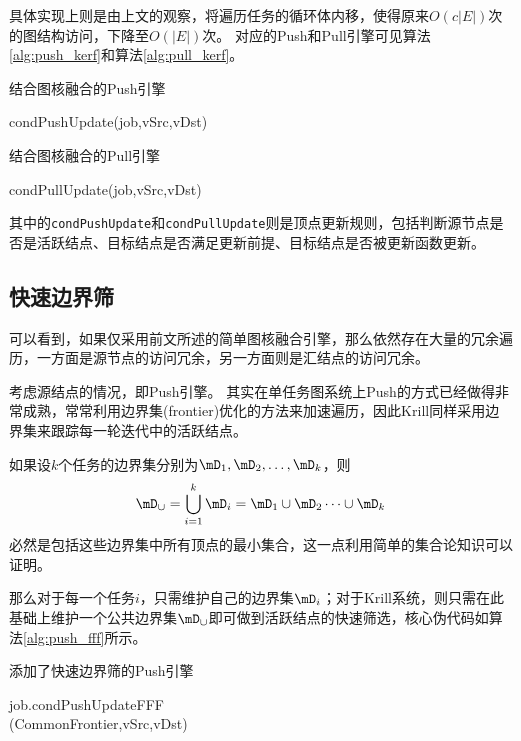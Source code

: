 \documentclass[logo,reportComp]{thesis}
\begin{document}
具体实现上则是由上文的观察，将遍历任务的循环体内移，使得原来$O(c|E|)$次的图结构访问，下降至$O(|E|)$次。
对应的Push和Pull引擎可见算法\ref{alg:push_kerf}和算法\ref{alg:pull_kerf}。
\begin{algorithm}[!ht]
\caption{结合图核融合的Push引擎}
\label{alg:push_kerf}
\begin{algorithmic}[1]
\State condPushUpdate(job,vSrc,vDst)
\EndFor
\EndFor
\EndFor
\end{algorithmic}
\end{algorithm}
\begin{algorithm}[!ht]
\caption{结合图核融合的Pull引擎}
\label{alg:pull_kerf}
\begin{algorithmic}[1]
\State condPullUpdate(job,vSrc,vDst)
\EndFor
\EndFor
\EndFor
\end{algorithmic}
\end{algorithm}

其中的\verb'condPushUpdate'和\verb'condPullUpdate'则是顶点更新规则，包括判断源节点是否是活跃结点、目标结点是否满足更新前提、目标结点是否被更新函数更新。

\subsection{快速边界筛}
可以看到，如果仅采用前文所述的简单图核融合引擎，那么依然存在大量的冗余遍历，一方面是源节点的访问冗余，另一方面则是汇结点的访问冗余。

考虑源结点的情况，即Push引擎。
其实在单任务图系统上Push的方式已经做得非常成熟，常常利用边界集(frontier)优化的方法来加速遍历\cite{shun:ligra_ppopp_2013,zhu:gemini_osdi_2016}，因此Krill同样采用边界集来跟踪每一轮迭代中的活跃结点。

如果设$k$个任务的边界集分别为$\mD_1,\mD_2,\ldots,\mD_k$，则
\begin{equation}
\mD_\cup=\bigcup_{i=1}^k\mD_i=\mD_1\cup\mD_2\cdots\cup\mD_k
\end{equation}
必然是包括这些边界集中所有顶点的最小集合，这一点利用简单的集合论知识可以证明。

那么对于每一个任务$i$，只需维护自己的边界集$\mD_i$；对于Krill系统，则只需在此基础上维护一个公共边界集$\mD_\cup$即可做到活跃结点的快速筛选，核心伪代码如算法\ref{alg:push_fff}所示。
\begin{algorithm}[htbp]
\caption{添加了快速边界筛的Push引擎}
\label{alg:push_fff}
\begin{algorithmic}[1]
\State job.condPushUpdateFFF\\\qquad\qquad\qquad(CommonFrontier,vSrc,vDst)
\EndFor
\EndFor
\EndFor
\end{algorithmic}
\end{algorithm}
\end{document}
